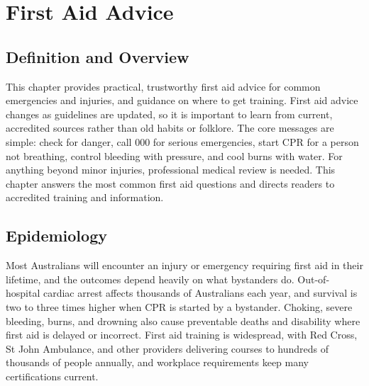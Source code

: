 \chapter{First Aid Advice}

\section*{Definition and Overview}
This chapter provides practical, trustworthy first aid advice for common emergencies and injuries, and guidance on where to get training. First aid advice changes as guidelines are updated, so it is important to learn from current, accredited sources rather than old habits or folklore. The core messages are simple: check for danger, call 000 for serious emergencies, start CPR for a person not breathing, control bleeding with pressure, and cool burns with water. For anything beyond minor injuries, professional medical review is needed. This chapter answers the most common first aid questions and directs readers to accredited training and information.

\section*{Epidemiology}
Most Australians will encounter an injury or emergency requiring first aid in their lifetime, and the outcomes depend heavily on what bystanders do. Out-of-hospital cardiac arrest affects thousands of Australians each year, and survival is two to three times higher when CPR is started by a bystander. Choking, severe bleeding, burns, and drowning also cause preventable deaths and disability where first aid is delayed or incorrect. First aid training is widespread, with Red Cross, St John Ambulance, and other providers delivering courses to hundreds of thousands of people annually, and workplace requirements keep many certifications current.

